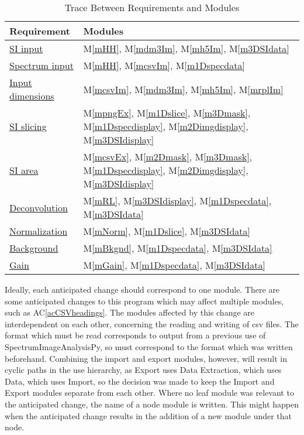 \documentclass[12pt, titlepage]{article}
\newcommand{\acref}[1]{AC\ref{#1}}
\newcommand{\mref}[1]{M\ref{#1}}
\newcommand{\progname}{SpectrumImageAnalysisPy}
\begin{document}
\begin{table}[H]
	\centering
	\begin{tabular}{p{} p{}}
		\toprule
		\textbf{Requirement} & \textbf{Modules}\\
		\midrule
		\hyperref[R_SI_inputs]{SI input} & \mref{mHH}, \mref{mdm3Im}, \mref{mh5Im}, \mref{m3DSIdata}\\
		\hyperref[R_spectrum_inputs]{Spectrum input} & \mref{mHH}, \mref{mcsvIm}, \mref{m1Dspecdata}\\
		\hyperref[R_Input_dimension]{Input dimensions} & \mref{mcsvIm}, \mref{mdm3Im}, \mref{mh5Im}, \mref{mrplIm}\\
		\hyperref[R_SI_slicing]{SI slicing} & \mref{mpngEx}, \mref{m1Dslice}, \mref{m3Dmask}, \mref{m1Dspecdisplay}, \mref{m2Dimgdisplay}, \mref{m3DSIdisplay}\\
		\hyperref[R_SI_area]{SI area} & \mref{mcsvEx}, \mref{m2Dmask}, \mref{m3Dmask}, \mref{m1Dspecdisplay}, \mref{m2Dimgdisplay}, \mref{m3DSIdisplay}\\
		\hyperref[R_deconvolution]{Deconvolution} & \mref{mRL}, \mref{m3DSIdisplay}, \mref{m1Dspecdata}, \mref{m3DSIdata}\\
		\hyperref[R_normalization]{Normalization} & \mref{mNorm}, \mref{m1Dslice}, \mref{m3DSIdata}\\
		\hyperref[R_background]{Background} & \mref{mBkgnd}, \mref{m1Dspecdata}, \mref{m3DSIdata}\\
		\hyperref[R_gain]{Gain} & \mref{mGain}, \mref{m1Dspecdata}, \mref{m3DSIdata}\\
		\bottomrule
	\end{tabular}
	\caption{Trace Between Requirements and Modules}
	\label{TblRT}
\end{table}

Ideally, each anticipated change should correspond to one module. There are some anticipated changes to this program which may affect multiple modules, such as \acref{acCSVheadings}. The modules affected by this change are interdependent on each other, concerning the reading and writing of csv files. The format which must be read corresponds to output from a previous use of \progname, so must correspond to the format which was written beforehand. Combining the import and export modules, however, will result in cyclic paths in the use hierarchy, as Export uses Data Extraction, which uses Data, which uses Import, so the decision was made to keep the Import and Export modules separate from each other.
Where no leaf module was relevant to the anticipated change, the name of a node module is written. This might happen when the anticipated change results in the addition of a new module under that node.
\end{document}
